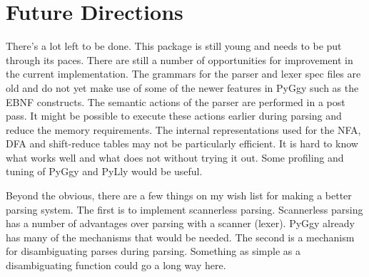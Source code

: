 
\chapter{Future Directions}

There's a lot left to be done.  This package is still young and
needs to be put through its paces.  There are still a number of
opportunities for improvement in the current implementation.
The grammars for the parser and lexer spec files are old and
do not yet make use of some of the newer features in PyGgy such
as the EBNF constructs.  The semantic actions of the parser are
performed in a post pass.  It might be possible to execute
these actions earlier during parsing and reduce the memory
requirements.  The internal representations used for the NFA,
DFA and shift-reduce tables may not be particularly efficient.
It is hard to know what works well and what does not without
trying it out.  Some profiling and tuning of PyGgy and PyLly
would be useful.

Beyond the obvious, there are a few things on my wish list for
making a better parsing system.  The first is to implement
scannerless parsing.  Scannerless parsing has a number of
advantages over parsing with a scanner (lexer).  PyGgy already
has many of the mechanisms that would be needed.  The second
is a mechanism for disambiguating parses during parsing.   Something
as simple as a disambiguating function could go a long way here.


